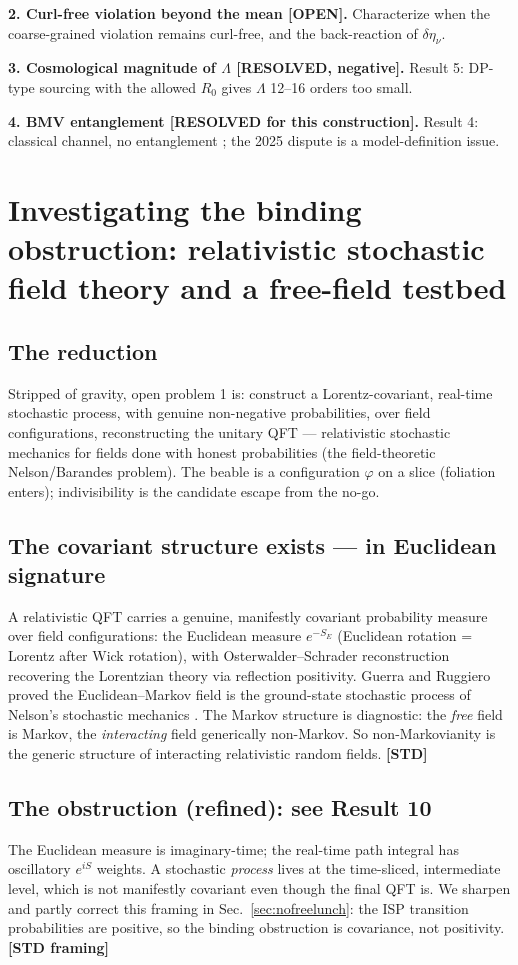\documentclass[aps,prd,preprint,amsmath,amssymb,nofootinbib,superscriptaddress]{revtex4-2}
\begin{document}
\textbf{2. Curl-free violation beyond the mean [OPEN].} Characterize when the coarse-grained
violation remains curl-free, and the back-reaction of $\delta\eta_\nu$.

\textbf{3. Cosmological magnitude of $\Lambda$ [RESOLVED, negative].} Result 5: DP-type
sourcing with the allowed $R_0$ gives $\Lambda$ 12--16 orders too small.

\textbf{4. BMV entanglement [RESOLVED for this construction].} Result 4: classical channel,
no entanglement \cite{KTM2014}; the 2025 dispute is a model-definition issue.

\section{Investigating the binding obstruction: relativistic stochastic field theory and a free-field testbed}
\label{sec:rsft}

\subsection{The reduction}
Stripped of gravity, open problem 1 is: construct a Lorentz-covariant, real-time stochastic
process, with genuine non-negative probabilities, over field configurations, reconstructing
the unitary QFT --- relativistic stochastic mechanics for fields done with honest
probabilities (the field-theoretic Nelson/Barandes problem). The beable is a configuration
$\varphi$ on a slice (foliation enters); indivisibility is the candidate escape from the
no-go.

\subsection{The covariant structure exists --- in Euclidean signature}
A relativistic QFT carries a genuine, manifestly covariant probability measure over field
configurations: the Euclidean measure $e^{-S_E}$ (Euclidean rotation = Lorentz after Wick
rotation), with Osterwalder--Schrader reconstruction recovering the Lorentzian theory via
reflection positivity. Guerra and Ruggiero proved the Euclidean--Markov field is the
ground-state stochastic process of Nelson's stochastic mechanics
\cite{GuerraRuggiero1973,Nelson1973}. The Markov structure is diagnostic: the \emph{free}
field is Markov, the \emph{interacting} field generically non-Markov. So non-Markovianity is
the generic structure of interacting relativistic random fields. \textbf{[STD]}

\subsection{The obstruction (refined): see Result 10}
The Euclidean measure is imaginary-time; the real-time path integral has oscillatory
$e^{iS}$ weights. A stochastic \emph{process} lives at the time-sliced, intermediate level,
which is not manifestly covariant even though the final QFT is. We sharpen and partly correct
this framing in Sec.~\ref{sec:nofreelunch}: the ISP transition probabilities are positive, so
the binding obstruction is covariance, not positivity. \textbf{[STD framing]}
\end{document}
